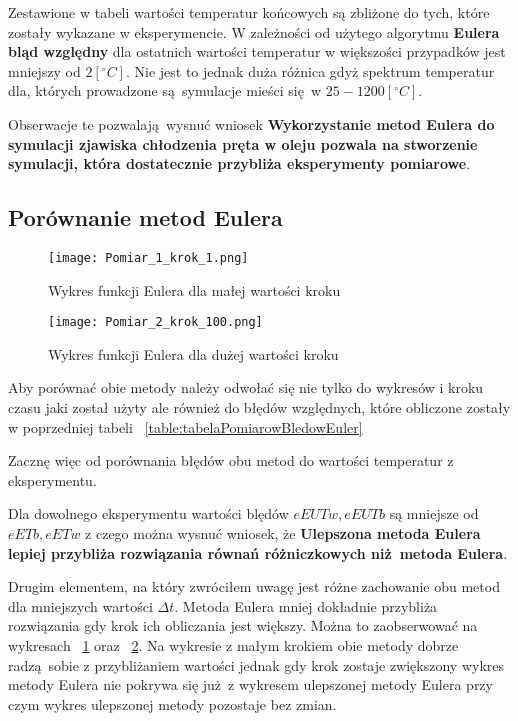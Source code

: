 \documentclass[varwidth,12pt,a4paper]{article}
\begin{document}
Zestawione w tabeli wartości temperatur końcowych są zbliżone do tych, które zostały wykazane w eksperymencie.
W zależności od użytego algorytmu \textbf{Eulera} \textbf{bląd względny} dla ostatnich wartości temperatur w większości
przypadków jest mniejszy od $2 [^\circ C]$. Nie jest to jednak duża różnica gdyż spektrum temperatur dla, których
prowadzone są symulacje mieści się w $25-1200 [^\circ C]$.

Obserwacje te pozwalają wysnuć wniosek \textbf{Wykorzystanie metod Eulera do symulacji zjawiska chłodzenia
pręta w oleju pozwala na stworzenie symulacji, która dostatecznie przybliża eksperymenty pomiarowe}.


\subsection{Porównanie metod Eulera}

\begin{figure}
    \texttt{[image: Pomiar\_1\_krok\_1.png]}
    \caption{Wykres funkcji Eulera dla małej wartości kroku}
    \label{fig:wykresEulerMalyKrok}
\end{figure}
\begin{figure}
    \texttt{[image: Pomiar\_2\_krok\_100.png]} 
    \caption{Wykres funkcji Eulera dla dużej wartości kroku}
    \label{fig:wykresEulerDuzyKrok}
\end{figure}

Aby porównać obie metody należy odwołać się nie tylko do wykresów i kroku czasu jaki został użyty ale również
do błędów względnych, które obliczone zostały w poprzedniej tabeli ~\ref{table:tabelaPomiarowBledowEuler}

Zacznę więc od porównania błędów obu metod do wartości temperatur z eksperymentu.

Dla dowolnego eksperymentu wartości blędów $eEUTw, eEUTb$ są mniejsze od $eETb, eETw$ z czego można wysnuć wniosek,
że \textbf{Ulepszona metoda Eulera lepiej przybliża rozwiązania równań różniczkowych niż metoda Eulera}.

Drugim elementem, na który zwróciłem uwagę jest różne zachowanie obu metod dla mniejszych wartości $\Delta t$.
Metoda Eulera mniej dokładnie przybliża rozwiązania gdy krok ich obliczania jest większy. Można to 
zaobserwować na wykresach ~\ref{fig:wykresEulerMalyKrok} oraz ~\ref{fig:wykresEulerDuzyKrok}.
Na wykresie z małym krokiem obie metody dobrze radzą sobie z przybliżaniem wartości jednak gdy
krok zostaje zwiększony wykres metody Eulera nie pokrywa się już z wykresem ulepszonej metody Eulera przy czym
wykres ulepszonej metody pozostaje bez zmian.
\end{document}
